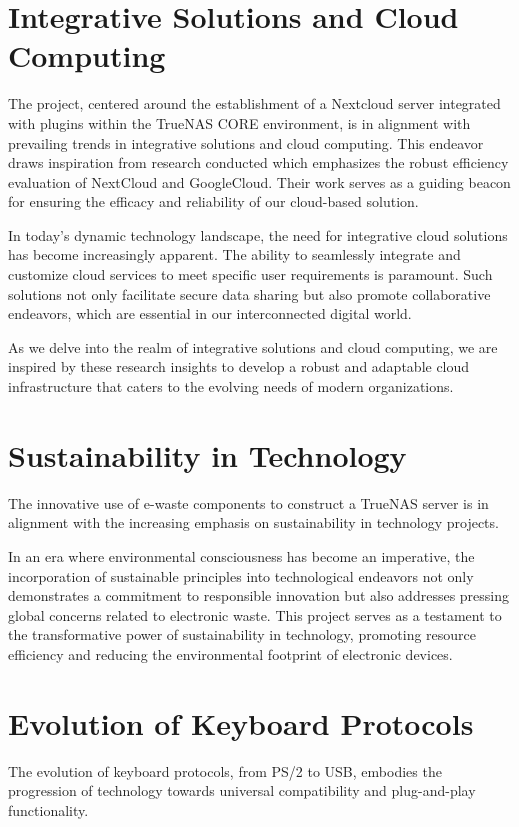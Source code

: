 \section{Integrative Solutions and Cloud Computing}

The project, centered around the establishment of a Nextcloud server integrated with plugins within the TrueNAS CORE environment, is in alignment with prevailing trends in integrative solutions and cloud computing. This endeavor draws inspiration from research conducted \cite{singh2021robust} which emphasizes the robust efficiency evaluation of NextCloud and GoogleCloud. Their work serves as a guiding beacon for ensuring the efficacy and reliability of our cloud-based solution.

In today's dynamic technology landscape, the need for integrative cloud solutions has become increasingly apparent. The ability to seamlessly integrate and customize cloud services to meet specific user requirements is paramount. Such solutions not only facilitate secure data sharing but also promote collaborative endeavors, which are essential in our interconnected digital world.

As we delve into the realm of integrative solutions and cloud computing, we are inspired by these research insights to develop a robust and adaptable cloud infrastructure that caters to the evolving needs of modern organizations.

\section{Sustainability in Technology}

The innovative use of e-waste components to construct a TrueNAS server is in alignment with the increasing emphasis on sustainability in technology projects. 

In an era where environmental consciousness has become an imperative, the incorporation of sustainable principles into technological endeavors not only demonstrates a commitment to responsible innovation but also addresses pressing global concerns related to electronic waste. This project serves as a testament to the transformative power of sustainability in technology, promoting resource efficiency and reducing the environmental footprint of electronic devices.


\section{Evolution of Keyboard Protocols}
The evolution of keyboard protocols, from PS/2 to USB, embodies the progression of technology towards universal compatibility and plug-and-play functionality. 

